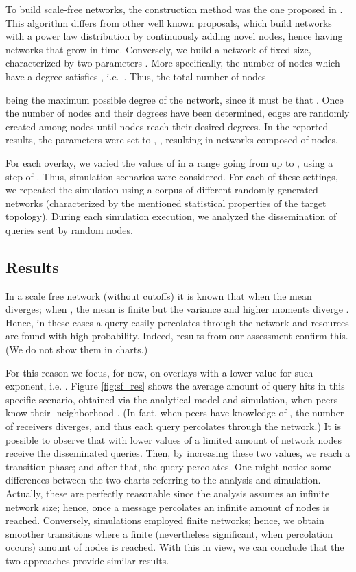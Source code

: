 \documentclass{sig-alternate}
\begin{document}
To build scale-free networks, the construction method was the one proposed in \cite{Aiello00arandom}.
This algorithm differs from other well known proposals, which build networks with a power law distribution by continuously adding novel nodes, hence having networks that grow in time. Conversely, we build a network of fixed size, characterized by two parameters . 
More specifically, 
the number  of nodes which have a degree  satisfies , i.e.~. 
Thus, the total number of nodes 

being  the maximum possible degree of the network, since it must be that .
Once the number of nodes and their degrees have been determined, edges are randomly created among nodes until nodes reach their desired degrees.
In the reported results, the parameters were set to , , resulting in networks composed of  nodes. 

For each overlay, we varied the values of  in a range going from  up to , using a step of . Thus,  simulation scenarios were considered. 
For each of these settings, we repeated the simulation using a corpus of  different randomly generated networks (characterized by the mentioned statistical properties of the target topology). During each simulation execution, we analyzed the dissemination of  queries sent by random nodes. 



\subsection{Results}

In a scale free network (without cutoffs) it is known that when  the mean diverges; when , the mean is finite but the variance and higher moments diverge \cite{newmanHandbook}. Hence, in these cases a query easily percolates through the network and resources are found with high probability. 
Indeed, results from our assessment confirm this. (We do not show them in charts.)

For this reason we focus, for now, on overlays with a lower value for such exponent, i.e. .
Figure \ref{fig:sf_res} shows the average amount of query hits in this specific scenario, obtained via the analytical model and simulation, when peers know their -neighborhood . (In fact, when peers have knowledge of , the number of receivers diverges, and thus each query percolates through the network.)
It is possible to observe that with lower values of  a limited amount of network nodes receive the disseminated queries. Then, by increasing these two values, we reach a transition phase; and after that, the query percolates.
One might notice some differences between the two charts referring to the analysis and simulation. Actually, these are perfectly reasonable since the analysis assumes an infinite network size; hence, once a message percolates an infinite amount of nodes is reached. Conversely, simulations employed finite networks; hence, we obtain smoother transitions where a finite (nevertheless significant, when percolation occurs) amount of nodes is reached.
With this in view, we can conclude that the two approaches provide similar results.
\end{document}
